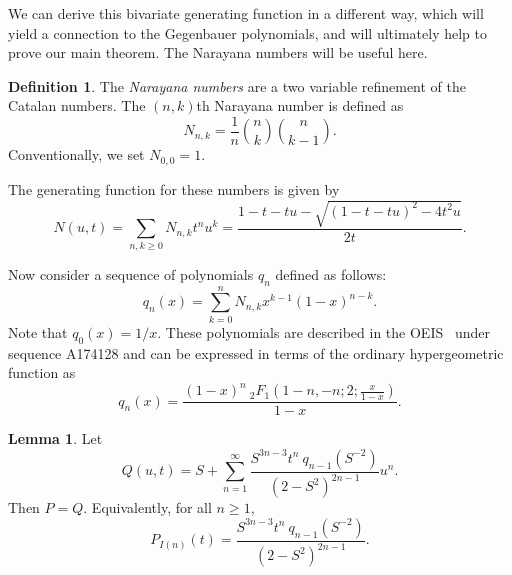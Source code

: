 \documentclass[10pt]{article}
\theoremstyle{definition}
\newtheorem{definition}[theorem]{Definition}
\newtheorem{lemma}[theorem]{Lemma}
\numberwithin{equation}{section}
\numberwithin{figure}{section}
\begin{document}
We can derive this bivariate generating function in a different way, which will yield a connection to the Gegenbauer polynomials, and will ultimately help to prove our main theorem. The Narayana numbers will be useful here. 

\begin{definition}
The \emph{Narayana numbers} are a two variable refinement of the Catalan numbers. The $(n,k)$th Narayana number is defined as 
\[
N_{n,k} = \frac{1}{n} \binom{n}{k} \binom{n}{k-1}.
\]
Conventionally, we set $N_{0,0} = 1$. 
\end{definition}

The generating function for these numbers is given by 
\[ 
    N(u,t) = \sum_{n,k \geq 0} N_{n,k} t^n u^k = 
    \frac{1 - t - tu - \sqrt{(1 - t - tu)^2 - 4t^2u}}{2t}. 
\]

Now consider a sequence of polynomials $q_n$ defined as follows:
\[
q_n(x) = \sum_{k=0}^n N_{n,k} x^{k-1} (1-x)^{n-k}.
\]
Note that $q_0(x) = 1/x$. These polynomials are described in the OEIS~\cite{oeis} under sequence A174128 and can be expressed in terms of the ordinary hypergeometric function as
\begin{equation}
\label{eqn:q_hypergeometric}
    q_n(x) = \frac{(1-x)^n\ _2F_1\left(1-n, -n; 2; \frac{x}{1-x}\right)}{1-x}.
\end{equation}



\begin{lemma}
Let 
\[      
Q(u,t) = S + \sum_{n=1}^\infty 
      \frac{S^{3n-3} t^n\ q_{n-1}(S^{-2})}{(2-S^2)^{2n-1}}u^n.
\]
Then $P = Q$. Equivalently, for all $n \geq 1$,
\[
P_{I(n)}(t) =    \frac{S^{3n-3} t^n\ q_{n-1}\left(S^{-2}\right)}{(2-S^2)^{2n-1}}.
\]
\end{lemma}
\end{document}
